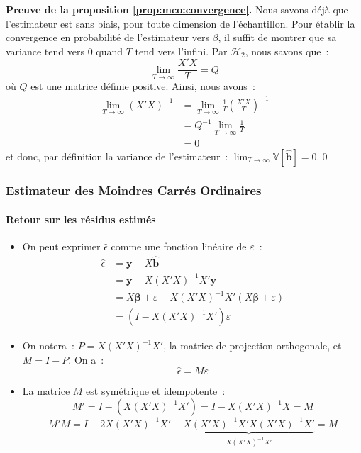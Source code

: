 \documentclass[10pt]{beamer}
\theoremstyle{plain}
\begin{document}
\begin{notes}

  \textbf{Preuve de la proposition \ref{prop:mco:convergence}.} Nous savons déjà que l'estimateur est sans biais, pour toute dimension de l'échantillon. Pour établir la convergence en probabilité de l'estimateur vers $\beta$, il suffit de montrer que sa variance tend vers 0 quand $T$ tend vers l'infini. Par $\mathcal H_2$, nous savons que~:
\[
      \lim_{T\rightarrow\infty} \frac{X'X}{T} = Q
    \]
    où $Q$ est une matrice définie positive. Ainsi, nous avons~:
    \[
      \begin{split}
        \lim_{T\to\infty} (X'X)^{-1} &= \lim_{T\to\infty} \frac{1}{T}\left(\frac{X'X}{T}\right)^{-1}\\
                                     &= Q^{-1}\lim_{T\to\infty} \frac{1}{T}\\
                                     &= 0
      \end{split}
    \]
    et donc, par définition la variance de l'estimateur~: $\lim_{T\to\infty} \mathbb V[\hat{\mathbf b}] = 0$.\qed
\end{notes}


\begin{frame}
  \frametitle{Estimateur des Moindres Carrés Ordinaires}
  \framesubtitle {Retour sur les résidus estimés}

  \begin{itemize}

  \item On peut exprimer $\hat\epsilon$ comme une fonction linéaire de $\varepsilon$~:
    \[
      \begin{split}
        \hat\epsilon &= \mathbf y-X\hat{\mathbf b}\\
                     &= \mathbf y - X(X'X)^{-1}X'\mathbf y\\
                     &= X\mathbf\beta + \varepsilon - X(X'X)^{-1}X'\left( X\mathbf\beta + \varepsilon\right)\\
                     &= \left( I -  X(X'X)^{-1}X'\right)\varepsilon
      \end{split}
    \]

    \medskip

  \item On notera~: $P = X(X'X)^{-1}X'$, la matrice de projection orthogonale, et $M = I-P$. On a~:
    \[
      \hat\epsilon = M\varepsilon
    \]

    \medskip

  \item La matrice $M$ est symétrique et idempotente~:
    \[
      M' = I - \left( X(X'X)^{-1}X' \right) = I - X(X'X)^{-1}X = M
    \]
    \[
      M'M = I-2X(X'X)^{-1}X'+\underbrace{X(X'X)^{-1}X'X(X'X)^{-1}X'}_{X(X'X)^{-1}X'}= M
    \]
  \end{itemize}

\end{frame}
\end{document}
